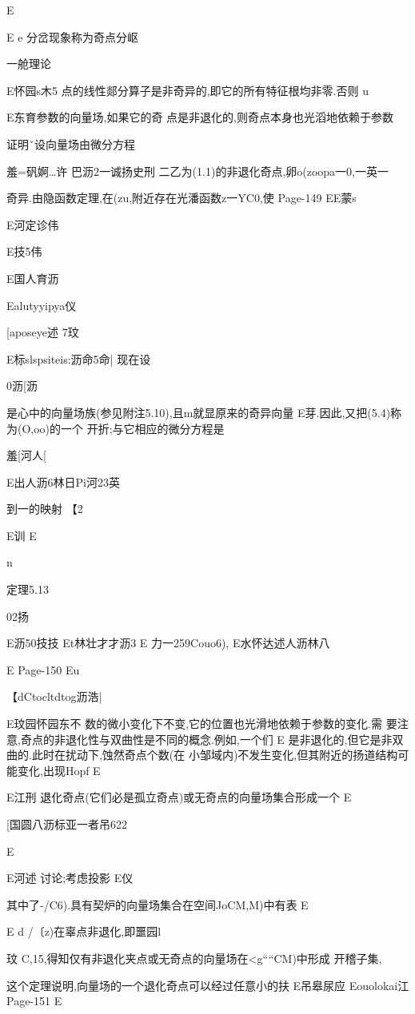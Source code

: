 {{{{{{{{{{E

E
e
分岔现象称为奇点分岖

一舱理论

E怀园s木5
点的线性郯分算子是非奇异的,即它的所有特征根均非零.否则
u

E东育参数的向量场,如果它的奇
点是非退化的,则奇点本身也光滔地依赖于参数

证明ˇ设向量场由微分方程

羞=矾婀…许
巴沥2一诚扬史刑
二乙为(1.1)的非退化奇点,卵o(zoopa一0,一英一

奇异.由隐函数定理,在(zu,附近存在光潘函数z一YC0,使
Page-149
EE蒙s

E河定诊伟

E技5伟

E国人育沥

Ealutyyipya仪

[aposeye述
7玟

E标slspsiteis:沥命5命|
现在设

0沥[沥

是心中的向量场族(参见附注5.10),且m就显原来的奇异向量
E芽.因此,又把(5.4)称为(O,oo)的一个
开折;与它相应的微分方程是

羞[河人[

E出人沥6林日Pi河23英

到一的映射
【2

E训
E

n

定理5.13

02扬

E沥50技技
Et林壮才才沥3
E
力一259Couo6),
E水怀达述人沥林八

E
Page-150
Eu

【dCtocltdtog沥浩|

E玟园怀园东不
数的微小变化下不变,它的位置也光滑地依赖于参数的变化.需
要注意,奇点的非退化性与双曲性是不同的概念.例如,一个们
E
是非退化的,但它是非双曲的.此时在扰动下,蚀然奇点个数(在
小邹域内)不发生变化,但其附近的扬道结构可能变化,出现Hopf
E

E江刑
退化奇点(它们必是孤立奇点)或无奇点的向量场集合形成一个
E

[国圆八沥标亚一者吊622

E

E河述
讨论;考虑投影
E仪

其中了-/C6).具有契炉的向量场集合在空间JoCM,M)中有表
E

E
d
/〔z)在辜点非退化,即噩园l

玟
C,15,得知仅有非退化夹点或无奇点的向量场在<g““CM)中形成
开稽子集,

这个定理说明,向量场的一个退化奇点可以经过任意小的扶
E吊皋尿应
Eouolokai江
Page-151
E

}}}}}}}}}}
